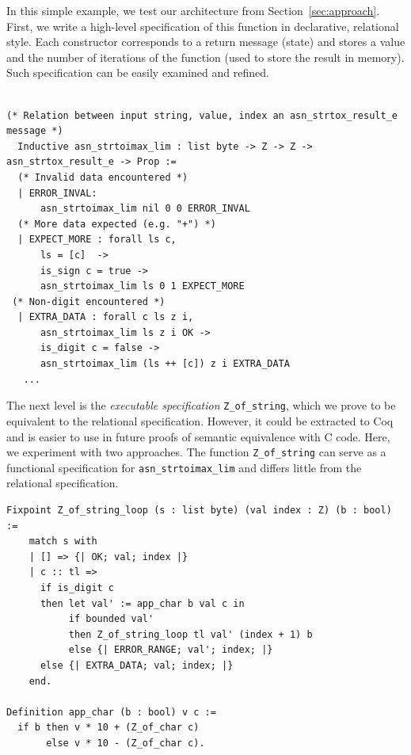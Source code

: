 \documentclass[acmsmall,nonacm]{acmart}
\begin{document}
In this simple example, we test our architecture from
Section~\ref{sec:approach}. First, we write a high-level specification
of this function in declarative, relational style. Each constructor
corresponds to a return message (state) and stores a value and the
number of iterations of the function (used to store the result in
memory). Such specification can be easily examined and refined.

 \begin{lstlisting}[language=Coq]

(* Relation between input string, value, index an asn_strtox_result_e message *)
  Inductive asn_strtoimax_lim : list byte -> Z -> Z -> asn_strtox_result_e -> Prop :=
  (* Invalid data encountered *)
  | ERROR_INVAL:
      asn_strtoimax_lim nil 0 0 ERROR_INVAL
  (* More data expected (e.g. "+") *)
  | EXPECT_MORE : forall ls c,
      ls = [c]  ->
      is_sign c = true ->
      asn_strtoimax_lim ls 0 1 EXPECT_MORE
 (* Non-digit encountered *)
  | EXTRA_DATA : forall c ls z i,
      asn_strtoimax_lim ls z i OK ->
      is_digit c = false -> 
      asn_strtoimax_lim (ls ++ [c]) z i EXTRA_DATA
   ...    
  \end{lstlisting}

  The next level is the \textit{executable specification}
  \texttt{Z\_of\_string}, which we prove to be equivalent to the
  relational specification. However, it could be extracted to Coq and
  is easier to use in future proofs of semantic equivalence with C
  code. Here, we experiment with two approaches. The function 
   \texttt{Z\_of\_string} can serve as a functional specification for
  \texttt{asn\_strtoimax\_lim} and differs little from the
  relational specification. 

 \begin{lstlisting}[language=Coq]
Fixpoint Z_of_string_loop (s : list byte) (val index : Z) (b : bool) := 
    match s with 
    | [] => {| OK; val; index |}
    | c :: tl => 
      if is_digit c
      then let val' := app_char b val c in 
           if bounded val'
           then Z_of_string_loop tl val' (index + 1) b
           else {| ERROR_RANGE; val'; index; |}      
      else {| EXTRA_DATA; val; index; |}              
    end.

Definition app_char (b : bool) v c := 
  if b then v * 10 + (Z_of_char c) 
       else v * 10 - (Z_of_char c).
 \end{lstlisting}
\end{document}
